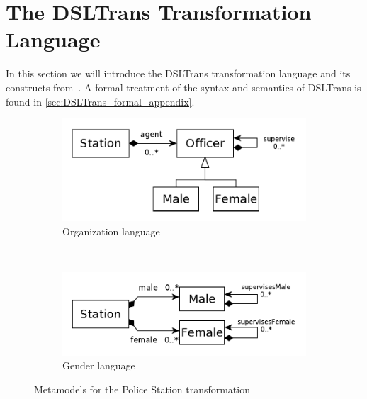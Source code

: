 \section{The DSLTrans Transformation Language}
\label{sec:dsltrans}

In this section we will introduce the DSLTrans transformation language and its
constructs from~\cite{DBLP:conf/sle/BarrocaLAFS10}. A formal treatment of the syntax and semantics of DSLTrans is found in \cref{sec:DSLTrans_formal_appendix}.




\begin{figure}[t]
        \centering
        \begin{subfigure}[b]{0.40\textwidth}
                \centering
                \includegraphics[width=1\textwidth]{./figures/policestation_dsltrans/organization.pdf}
                \caption{Organization language}
                \label{fig:OrganizationLanguage}
        \end{subfigure}%
        ~~
        \begin{subfigure}[b]{0.40\textwidth}
                \centering
                \includegraphics[width=1\textwidth]{./figures/policestation_dsltrans/gender.pdf}
                \caption{Gender language}
                \label{fig:GenderLanguage}
        \end{subfigure}%
        \caption{Metamodels for the Police Station transformation}
        \label{fig:squadmetamodel}
\end{figure}

